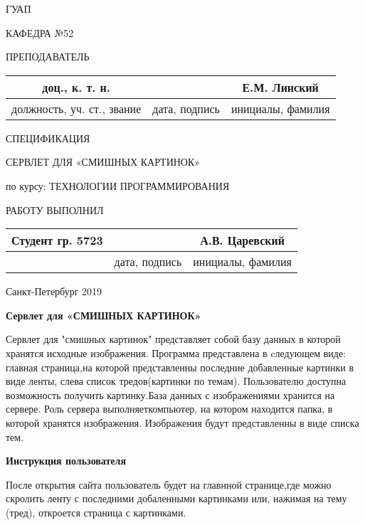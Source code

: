 \documentclass[12pt,a4paper]{article}
\begin{document}
\thispagestyle{empty}
\begin{center}
ГУАП

КАФЕДРА №52
\end{center}

\vspace{30mm}
ПРЕПОДАВАТЕЛЬ

\begin{tabular}{ |c|c|c| }
\hline
доц., к. т. н. & & Е.М. Линский \\\hline
должность, уч. ст., звание & дата, подпись & инициалы, фамилия \\\hline
\end{tabular}

\vspace{30mm}
\begin{center}
СПЕЦИФИКАЦИЯ

СЕРВЛЕТ ДЛЯ «СМИШНЫХ КАРТИНОК»
\end{center}

\vspace{10mm}
по курсу: ТЕХНОЛОГИИ ПРОГРАММИРОВАНИЯ

\vspace{50mm}
\hspace{8mm}РАБОТУ ВЫПОЛНИЛ
\begin{center}
\begin{tabular}{ |c|c|c| }
\hline
Студент гр. 5723 & & А.В. Царевский \\\hline
& дата, подпись & инициалы, фамилия \\
\hline
\end{tabular}
\vspace{15mm}

Санкт-Петербург 2019
\end{center}

\newpage
\begin{center}
\Large{\bf Сервлет для «СМИШНЫХ КАРТИНОК» }
\end{center}

Сервлет для "смишных картинок" представляет собой базу данных в
которой хранятся исходные изображения. Программа представлена в
cледующем виде: главная страница,на которой представленны последние добавленные картинки в виде ленты, слева список тредов(картинки по темам). Пользователю доступна возможность получить картинку.База данных с изображениями хранится на сервере. Роль сервера выполняеткомпьютер, на котором находится папка, в которой хранятся изображения. Изображения будут представленны в виде списка тем.

\newpage
\begin{center}
\Large{\bf Инструкция пользователя }
\end{center}
После открытия сайта пользователь будет на главнной странице,где можно скролить ленту с последними добаленными картинками или, нажимая на тему (тред), откроется страница с картинками.
\end{document}
